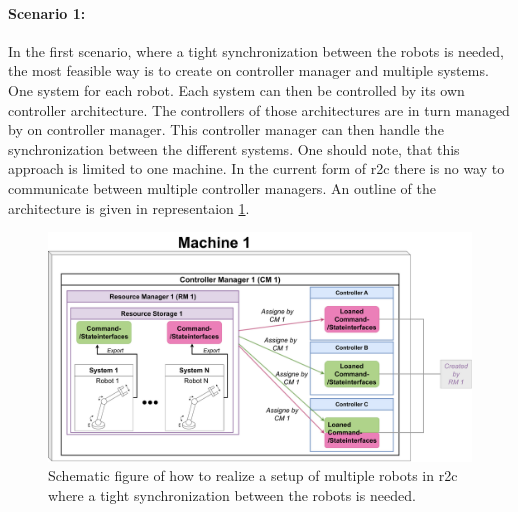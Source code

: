 \paragraph{Scenario 1:} 
In the first scenario, where a tight synchronization between the robots is needed, the most feasible way is to create on controller manager and multiple systems. One system for each robot. Each system can then be controlled by its own controller architecture. The controllers of those architectures are in turn managed by on controller manager. This controller manager can then handle the synchronization between the different systems.\newline
One should note, that this approach is limited to one machine. In the current form of \gls{r2c} there is no way to communicate between multiple controller managers. An outline of the architecture is given in representaion \ref{c3_fig_r2c_mr_ts}.
\begin{figure}[htbp]
	\centering
	\includegraphics[width=1\textwidth]{Figures/c3/multiple_robots_one_system_current-Page-1.pdf}
	\caption{Schematic figure of how to realize a setup of multiple robots in \gls{r2c} where a tight synchronization between the robots is needed.}
	\label{c3_fig_r2c_mr_ts}
\end{figure}

